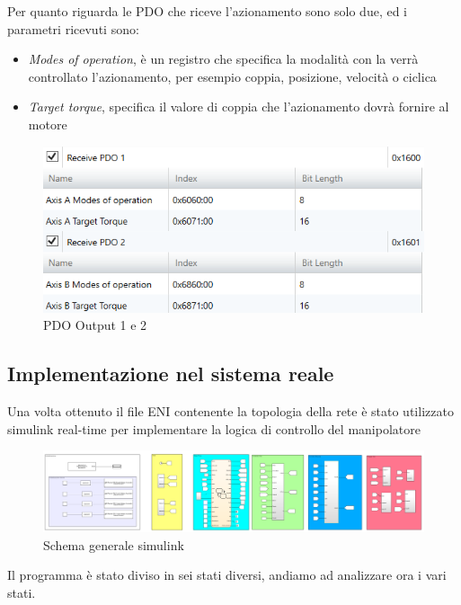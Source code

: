 Per quanto riguarda le PDO che riceve l'azionamento sono solo due, ed i parametri ricevuti sono:
\begin{itemize}
	\item \textit{Modes of operation}, è un registro che specifica la modalità con la verrà controllato l'azionamento, per esempio coppia, posizione, velocità o ciclica
	\item \textit{Target torque}, specifica il valore di coppia che l'azionamento dovrà fornire al motore
\end{itemize}
\begin{figure}[ht]
\begin{center}
    \includegraphics[scale=0.67]{Immagini/Sperimentale/pdo12out.png}
    \caption{PDO Output 1 e 2}
    \label{fig:PDOOut}
\end{center}
\end{figure}
\subsection{Implementazione nel sistema reale}
Una volta ottenuto il file ENI contenente la topologia della rete è stato utilizzato simulink real-time per implementare la logica di controllo del manipolatore
\begin{figure}[ht]
	\begin{center}
		\includegraphics[scale=0.5]{Immagini/Sperimentale/generalSchema}
		\caption{Schema generale simulink}
		\label{fig:SimulinkSchema}
	\end{center}
\end{figure}
Il programma è stato diviso in sei stati diversi, andiamo ad analizzare ora i vari stati.
